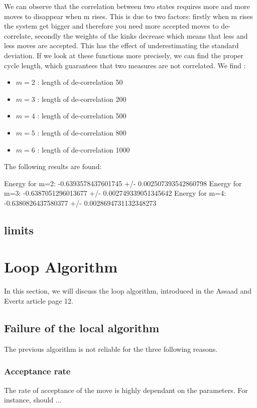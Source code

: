 \documentclass[a4paper,12pt,twoside]{article}
\begin{document}
	We can observe that the correlation between two states requires more and more moves to disappear when m rises. This is due to two factors: firstly when m rises the system get bigger and therefore you need more accepted moves to de-correlate, secondly the weights of the kinks  decrease which means that less and less moves are accepted.
	This has the effect of underestimating the standard deviation.
	If we look at these functions more precisely, we can find the proper cycle length, which guarantees that two measures are not correlated.
	We find :
	\begin{itemize}
		\item[] $m=2$ : length of de-correlation 50
		\item[] $m=3$ : length of de-correlation 200
		\item[] $m=4$ : length of de-correlation 500
		\item[] $m=5$ : length of de-correlation 800
		\item[] $m=6$ : length of de-correlation 1000
	\end{itemize}


	
	The following results are found:
	
	Energy for m=2: -0.6393578437601745 +/- 0.002507393542860798
	Energy for m=3: -0.6387051296013677 +/- 0.002749339051345642
	Energy for m=4: -0.6380826437580377 +/- 0.0028694731132348273
	
		 	
		 



	
	\subsection{limits}



	\section{Loop Algorithm}
	In this section, we will discuss the loop algorithm, introduced in the Assaad and Evertz article page 12. 
	
	\subsection{Failure of the local algorithm}
	The previous algorithm is not reliable for the three following reasons.
	


	\subsubsection{Acceptance rate} The rate of acceptance of the move is highly dependant on the parameters. For instance, should ...
	
\end{document}
